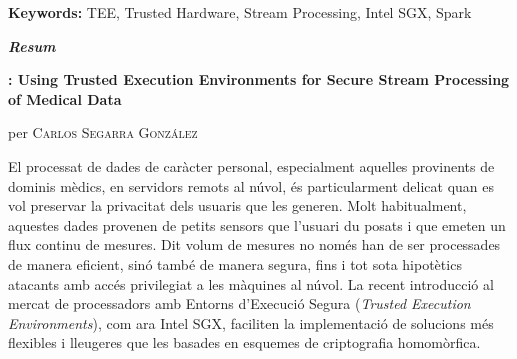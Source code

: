 \vspace{0.5cm}

\textbf{Keywords:} TEE, Trusted Hardware, Stream Processing, Intel SGX, Spark

\vfill
\pagebreak

\vspace*{2cm}
\begin{center}
%
%
%
%
%
%    
%
    \LARGE
    \textit{\textbf{Resum}} 

    \vspace{0.5cm}

    \large
    \textbf{\projName: Using Trusted Execution Environments for Secure Stream Processing of Medical Data}

    per \textsc{Carlos Segarra Gonz\'alez}
\end{center}

\vspace{0.5cm}

\normalsize

El processat de dades de car\`acter personal, especialment aquelles provinents de dominis m\`edics, en servidors remots al n\'uvol, \'es particularment delicat quan es vol preservar la privacitat dels usuaris que les generen.
Molt habitualment, aquestes dades provenen de petits sensors que l'usuari du posats i que emeten un flux continu de mesures.
Dit volum de mesures no nom\'es han de ser processades de manera eficient, sin\'o tamb\'e de manera segura, fins i tot sota hipot\`etics atacants amb acc\'es privilegiat a les m\`aquines al n\'uvol.
La recent introducci\'o al mercat de processadors amb Entorns d'Execuci\'o Segura (\textit{Trusted Execution Environments}), com ara Intel SGX, faciliten la implementaci\'o de solucions m\'es flexibles i lleugeres que les basades en esquemes de criptografia homom\`orfica.
    
